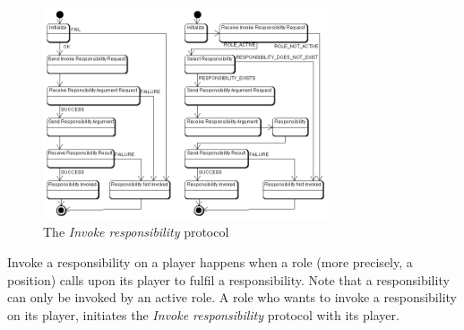 \begin{figure}[ht]
	\centering
	\includegraphics[width=0.75\textwidth]{images/thespian/invoke-responsibility-protocol.png}
	\caption{The \textit{Invoke responsibility} protocol}
	\label{figure:thespian-invoke-responsibility-protocol}
\end{figure}

Invoke a responsibility on a player happens when a role (more precisely, a position) calls upon its player to fulfil a responsibility.
Note that a responsibility can only be invoked by an active role.
A role who wants to invoke a responsibility on its player, initiates the \textit{Invoke responsibility} protocol with its player.

